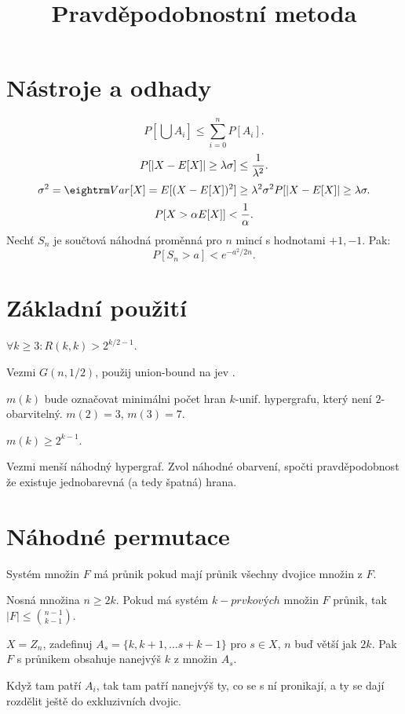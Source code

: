

\title{Pravděpodobnostní metoda}

\section{Nástroje a odhady}

$$P[\bigcup A_i] \le \sum_{i=0}^n P[A_i].$$
$$P[|X-E[X]| \ge \lambda\sigma] \le {1 \over \lambda^2}.$$
\prf{}
$$\sigma^2 = \var[X] = E[(X - E[X])^2] \ge \lambda^2 \sigma^2 P[|X-E[X]| \ge \lambda\sigma. $$
$$P[X > \alpha E[X]] < {1 \over \alpha}.$$
 Nechť $S_n$ je součtová náhodná proměnná pro $n$ mincí s hodnotami ${+1,-1}$. Pak:
$$P[S_n > a] < e^{-a^2 / 2n}.$$

\section{Základní použití}

 $\forall k \ge 3: R(k,k) > 2^{k/2 - 1}$.

\prf{} Vezmi $G(n,1/2)$, použij union-bound na jev .

\dfn{}$m(k)$ bude označovat minimálni počet hran $k$-unif. hypergrafu, který není
$2$-obarvitelný. $m(2) = 3$, $m(3) = 7$.

 $m(k) \ge 2^{k-1}$.

\prf{} Vezmi menší náhodný hypergraf. Zvol náhodné obarvení, spočti pravděpodobnost
že existuje jednobarevná (a tedy špatná) hrana.

\section{Náhodné permutace}

\dfn{}Systém množin $F$ {\I má průnik} pokud mají průnik všechny dvojice množin z $F$.

 Nosná množina $n \ge 2k$. Pokud má systém
$k-prvkových$ množin $F$ průnik, tak $|F| \le {n-1 \choose k-1}$.

\lem{} $X = Z_n$, zadefinuj $A_s = \{k,k+1,\dots s+k-1\}$ pro $s \in X$, $n$ buď
větší jak $2k$.  Pak $F$ s průnikem obsahuje nanejvýš $k$ z množin $A_s$.

\prf{} Když tam patří $A_i$, tak tam patří nanejvýš ty, co se s ní pronikají, a
ty se dají rozdělit ještě do exkluzivních dvojic.


